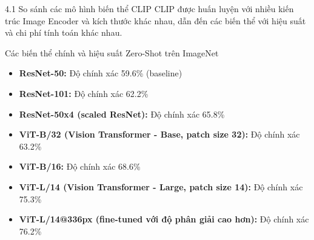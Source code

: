 \begin{frame}{4.1 So sánh các mô hình biến thể CLIP}
    CLIP được huấn luyện với nhiều kiến trúc Image Encoder và kích thước khác nhau, dẫn đến các biến thể với hiệu suất và chi phí tính toán khác nhau.

    \begin{block}{Các biến thể chính và hiệu suất Zero-Shot trên ImageNet}
        \begin{itemize}
            \item \textbf{ResNet-50:} Độ chính xác 59.6\% (baseline)
            \item \textbf{ResNet-101:} Độ chính xác 62.2\%
            \item \textbf{ResNet-50x4 (scaled ResNet):} Độ chính xác 65.8\%
            \item \textbf{ViT-B/32 (Vision Transformer - Base, patch size 32):} Độ chính xác 63.2\%
            \item \textbf{ViT-B/16:} Độ chính xác 68.6\%
            \item \textbf{ViT-L/14 (Vision Transformer - Large, patch size 14):} Độ chính xác 75.3\%
            \item \textbf{ViT-L/14@336px (fine-tuned với độ phân giải cao hơn):} Độ chính xác 76.2\%
        \end{itemize}
    \end{block}
\end{frame}

